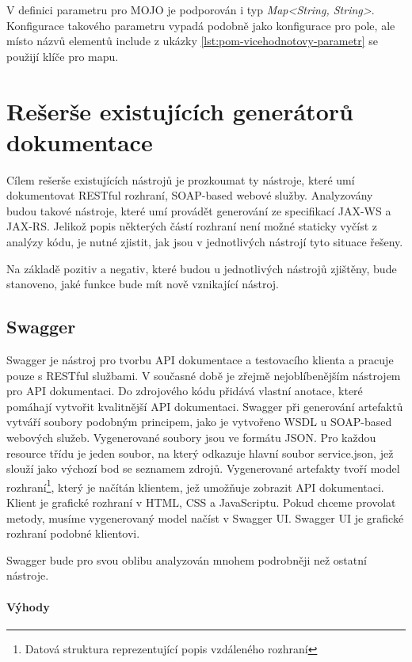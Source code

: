 \documentclass[11pt,twoside,a4paper]{book}
\begin{document}
V definici parametru pro MOJO je podporován i typ {\em Map<String, String>}.
Konfigurace takového parametru vypadá podobně jako konfigurace pro pole, ale místo názvů elementů
include z ukázky \ref{lst:pom-vicehodnotovy-parametr} se použijí klíče pro mapu.

\section{Rešerše existujících generátorů dokumentace}
\label{sec:reserse-existujicich-generatoru}

Cílem rešerše existujících nástrojů je prozkoumat ty nástroje, které umí
dokumentovat RESTful rozhraní, SOAP-based webové služby. Analyzovány budou
takové nástroje, které umí provádět generování ze specifikací JAX-WS a JAX-RS.
Jelikož popis některých částí rozhraní není možné staticky vyčíst z analýzy
kódu, je nutné zjistit, jak jsou v jednotlivých nástrojí tyto situace řešeny.

Na základě pozitiv a negativ, které budou u jednotlivých nástrojů zjištěny, bude stanoveno,
jaké funkce bude mít nově vznikající nástroj.

\subsection{Swagger}
\label{subsec:swagger}

Swagger \cite{SwaggerHome} je nástroj pro tvorbu API dokumentace a testovacího
klienta a pracuje pouze s RESTful službami.
V současné době je zřejmě nejoblíbenějším nástrojem pro API dokumentaci. Do
zdrojového kódu přidává vlastní anotace, které pomáhají vytvořit kvalitnější API
dokumentaci. Swagger při generování artefaktů vytváří soubory podobným
principem, jako je vytvořeno WSDL u SOAP-based webových služeb. Vygenerované
soubory jsou ve formátu JSON. Pro každou resource třídu je jeden soubor, na
který odkazuje hlavní soubor service.json, jež slouží jako výchozí bod se
seznamem zdrojů. Vygenerované artefakty tvoří model rozhraní\footnote{Datová
struktura reprezentující popis vzdáleného rozhraní}, který je načítán klientem,
jež umožňuje zobrazit API dokumentaci.
Klient je grafické rozhraní v HTML, CSS a JavaScriptu. Pokud chceme provolat
metody, musíme vygenerovaný model načíst v Swagger UI. Swagger UI je grafické
rozhraní podobné klientovi.

Swagger bude pro svou oblibu analyzován mnohem podrobněji než ostatní nástroje.

\paragraph{Výhody}
\end{document}
